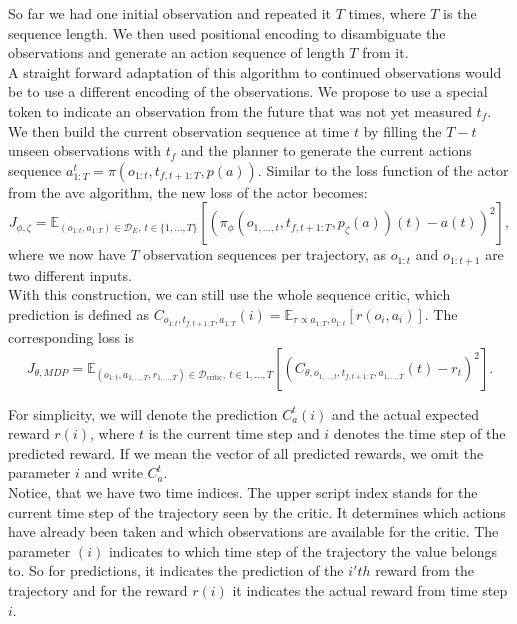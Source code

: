 So far we had one initial observation and repeated it $T$ times, where $T$ is the sequence length. We then used positional encoding to disambiguate the observations and generate an action sequence of 
length $T$ from it.\\ 

A straight forward adaptation of this algorithm to continued observations would be to use a different encoding of the observations. We propose to use a special token to indicate an 
observation from the future that was not yet measured $t_f$. We then build the current observation sequence at time $t$ by filling the $T - t$ unseen observations with $t_f$ and 
the planner to 
generate the current actions sequence $a^t_{1:T} = \pi(o_{1:t}, t_{f, t+1:T}, p(a))$. Similar to the loss function of the actor from the \ac{avc} algorithm, the new loss of the actor becomes: 
\begin{equation}
    \label{dense_actor_objective}
    J_{\phi, \zeta} = \mathbb{E}_{(o_{1:t}, a_{1:T}) \in \mathcal{D}_E,\ t \in \{1, ..., T\}}\left[\left( \pi_{\phi}(o_{1, ..., t}, t_{f, t+1:T}, p_{\zeta}(a))(t) - a(t)\right)^2\right],
\end{equation}
where we now have $T$ observation sequences per trajectory, as $o_{1:t}$ and $o_{1:t+1}$ are two different inputs.\\
With this construction, we can still use the whole sequence critic, 
which prediction is defined as $C_{o_{1:t}, t_{f, t+1:T}, a_{1:T}}(i) = \mathbb{E}_{\tau \propto a_{1:T}, o_{1:t}}\left[r(o_i, a_i)\right]$. The corresponding loss is
\begin{equation}
    \label{eq:dense_critic_loss}
    J_{\theta, MDP} = \mathbb{E}_{(o_{1:t}, a_{1,...,T}, r_{1,...,T}) \in \mathcal{D}_{\text{critic}},\ t \in {1, ..., T}}\left[(C_{\theta, o_{1, ..., t}, t_{f, t+1:T},  a_{1,...,T}}(t) - r_t)^2\right].
\end{equation}

For simplicity, we will denote the prediction 
$C_a^t(i)$ and the actual expected reward $r(i)$, where $t$ is the current time step and $i$ denotes the time step of the predicted reward. If we mean the vector of all predicted rewards, we omit the 
parameter $i$ and write $C_a^t$.\\ 

Notice, that we have two time indices. The upper script index stands for the current time step of the trajectory seen by the critic. 
It determines which actions have already been taken and 
which observations are available for the critic. The parameter $(i)$ indicates to which time step of the trajectory the value belongs to. So for predictions, it indicates the prediction of the $i'th$ 
reward from the trajectory and for the reward $r(i)$ it indicates the actual reward from time step $i$.\\ 

